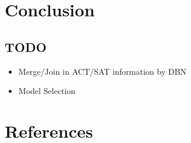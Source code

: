 \documentclass[
  man,floatsintext]{apa6}
\providecommand{\tightlist}{%
  \setlength{\itemsep}{0pt}\setlength{\parskip}{0pt}}
\begin{document}
\hypertarget{conclusion}{%
\section{Conclusion}\label{conclusion}}

\hypertarget{todo}{%
\subsection{TODO}\label{todo}}

\begin{itemize}
\tightlist
\item
  Merge/Join in ACT/SAT information by DBN
\item
  Model Selection
\end{itemize}

\newpage

\hypertarget{references}{%
\section{References}\label{references}}
\end{document}
